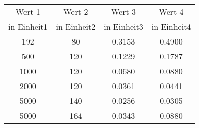 
\blindtext[1]

\begin{center}
\begin{tabular}{|c|c|c|c|}
\hline
Wert 1 & Wert 2 & Wert 3 & Wert 4\\
in Einheit1 & in Einheit2 & in Einheit3 & in Einheit4 \\
\hline
192 & 80& 0.3153 & 0.4900\\
500 & 120& 0.1229& 0.1787\\
1000 & 120& 0.0680& 0.0880\\
2000 & 120& 0.0361& 0.0441\\
5000 & 140& 0.0256& 0.0305\\
5000 & 164& 0.0343& 0.0880\\
\hline
\end{tabular}
\label{tab:table1}
\end{center}

\blindtext[3]